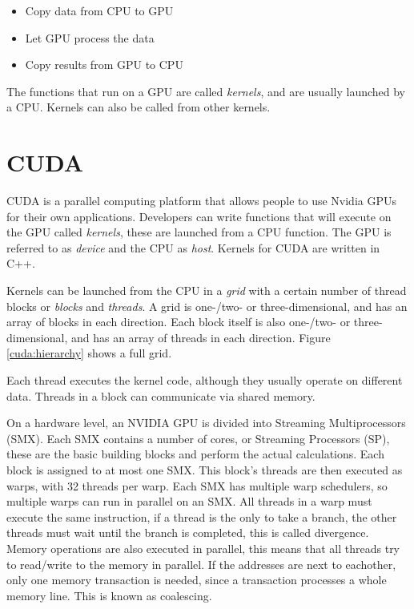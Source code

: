 \documentclass[../main/thesis.tex]{subfiles}
\begin{document}
\begin{itemize}
\item Copy data from CPU to GPU
\item Let GPU process the data
\item Copy results from GPU to CPU
\end{itemize}

The functions that run on a GPU are called \textit{kernels}, and are usually launched by a CPU.
Kernels can also be called from other kernels.


\section{CUDA}
CUDA is a parallel computing platform that allows people to use Nvidia GPUs for their own applications.
Developers can write functions that will execute on the GPU called \textit{kernels}, these are launched from a CPU function.
The GPU is referred to as \textit{device} and the CPU as \textit{host}.
Kernels for CUDA are written in C++.

Kernels can be launched from the CPU in a \textit{grid} with a certain number of thread blocks or \textit{blocks} and \textit{threads}.
A grid is one-/two- or three-dimensional, and has an array of blocks in each direction.
Each block itself is also one-/two- or three-dimensional, and has an array of threads in each direction.
Figure \ref{cuda:hierarchy} shows a full grid.


Each thread executes the kernel code, although they usually operate on different data.
Threads in a block can communicate via shared memory.

On a hardware level, an NVIDIA GPU is divided into Streaming Multiprocessors (SMX).
Each SMX contains a number of cores, or Streaming Processors (SP), these are the basic building blocks and perform the actual calculations.
Each block is assigned to at most one SMX.
This block's threads are then executed as warps, with 32 threads per warp.
Each SMX has multiple warp schedulers, so multiple warps can run in parallel on an SMX.
All threads in a warp must execute the same instruction, if a thread is the only to take a branch, the other threads must wait until the branch is completed, this is called divergence.
Memory operations are also executed in parallel, this means that all threads try to read/write to the memory in parallel.
If the addresses are next to eachother, only one memory transaction is needed, since a transaction processes a whole memory line.
This is known as coalescing.
\end{document}
